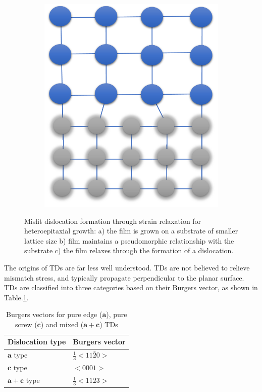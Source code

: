 \begin{figure}
\begin{subfigure}[b]{0.3\textwidth}
	\end{subfigure}%
	\hspace*{0.5cm}
	\begin{subfigure}[b]{0.3\textwidth}
		\centering
		\includegraphics[width=.85\linewidth]{Figs/Ch1/MDc}
		\caption{}
	\end{subfigure}%

	\caption{Misfit dislocation formation through strain relaxation for heteroepitaxial growth: a) the film is grown on a substrate of smaller lattice size b) film maintains a pseudomorphic relationship with the substrate c) the film relaxes through the formation of a dislocation.}
\end{figure}
\FloatBarrier

The origins of TDs are far less well understood. TDs are not believed to relieve mismatch stress, and typically propagate perpendicular to the planar surface. TDs are classified into three categories based on their Burgers vector, as shown in Table.\ref{tab1.4}.

\begin{table}[h]
	\centering
	\begin{tabular}{p{4cm} p{4cm}   }
		\centering
		\textbf{Dislocation type}& \textbf{Burgers vector} \\
		\hline
		$\mathbf{a}$ type & $\frac{1}{3}<11\bar{2}0>$ \\
		$\mathbf{c}$ type& $<0001>$ \\
		$\mathbf{a+c}$ type & $\frac{1}{3}<11\bar{2}3>$ \\
		\hline
		
	\end{tabular}
	\caption{Burgers vectors for pure edge ($\mathbf{a}$), pure screw ($\mathbf{c}$) and mixed ($\mathbf{a+c}$)  TDs}
	\label{tab1.4}
\end{table}
\FloatBarrier

